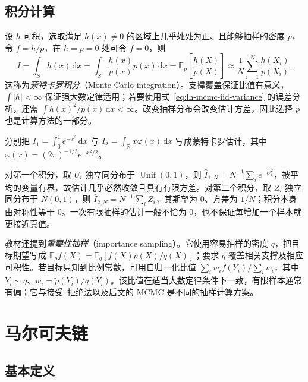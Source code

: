 \subsection{积分计算}
\label{subsec:lh-mcmc-integration}

设 $h$ 可积，选取满足 $h(x)\ne0$ 的区域上几乎处处为正、且能够抽样的密度 $p$，令 $f=h/p$，在 $h=p=0$ 处可令 $f=0$，则
\begin{equation}
I=\int_S h(x)\,\mathrm dx
=\int_S\frac{h(x)}{p(x)}p(x)\,\mathrm dx
=\mathbb E_p\!\left[\frac{h(X)}{p(X)}\right]
\approx\frac1N\sum_{i=1}^N\frac{h(X_i)}{p(X_i)}.
\label{eq:lh-mcmc-integral}
\end{equation}
这称为\emph{蒙特卡罗积分}（Monte Carlo integration）。支撑覆盖保证比值有意义，$\int |h|<\infty$ 保证强大数定律适用；若要使用式~\eqref{eq:lh-mcmc-iid-variance} 的误差分析，还需 $\int h(x)^2/p(x)\,\mathrm dx<\infty$。改变抽样分布会改变估计方差，因此选择 $p$ 也是计算方法的一部分。

\begin{example}
\label{ex:lh-mcmc-integrals}
分别把 $I_1=\int_0^1e^{-x^2}\,\mathrm dx$ 与 $I_2=\int_{\mathbb R}x\varphi(x)\,\mathrm dx$ 写成蒙特卡罗估计，其中 $\varphi(x)=(2\pi)^{-1/2}e^{-x^2/2}$。
\end{example}
\begin{solve}
对第一个积分，取 $U_i$ 独立同分布于 $\operatorname{Unif}(0,1)$，则 $\widehat I_{1,N}=N^{-1}\sum_i e^{-U_i^2}$，被平均的变量有界，故估计几乎必然收敛且具有有限方差。对第二个积分，取 $Z_i$ 独立同分布于 $N(0,1)$，则 $\widehat I_{2,N}=N^{-1}\sum_i Z_i$，其期望为 $0$、方差为 $1/N$；积分本身由对称性等于 $0$。一次有限抽样的估计一般不恰为 $0$，也不保证每增加一个样本就更接近真值。
\end{solve}

教材还提到\emph{重要性抽样}（importance sampling）。它使用容易抽样的密度 $q$，把目标期望写成 $\mathbb E_p f(X)=\mathbb E_q[f(X)p(X)/q(X)]$；要求 $q$ 覆盖相关支撑及相应可积性。若目标只知到比例常数，可用自归一化比值 $\sum_i w_i f(Y_i)/\sum_i w_i$，其中 $Y_i\sim q$、$w_i=\widetilde p(Y_i)/q(Y_i)$。该比值在适当大数定律条件下一致，有限样本通常有偏；它与接受--拒绝法以及后文的 MCMC 是不同的抽样计算方案。

\section{马尔可夫链}
\label{sec:lh-mcmc-markov-chain}

\subsection{基本定义}
\label{subsec:lh-mcmc-markov-definition}

